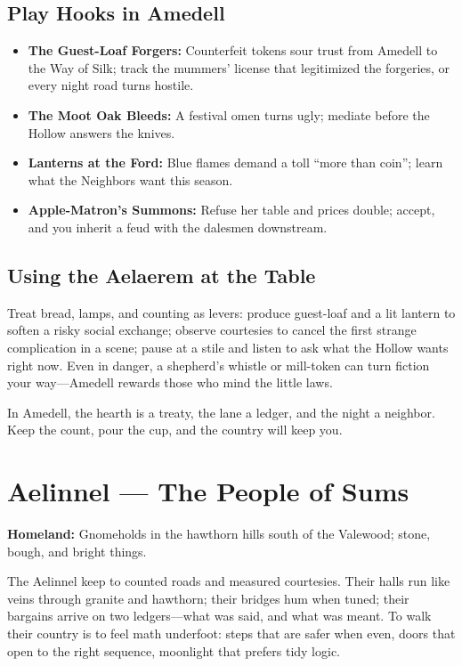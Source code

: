\documentclass[11pt]{book}
\begin{document}
\subsection*{Play Hooks in Amedell}
\begin{itemize}
    \item \textbf{The Guest-Loaf Forgers:} Counterfeit tokens sour trust from Amedell to the Way of Silk; track the mummers' license that legitimized the forgeries, or every night road turns hostile.
    \item \textbf{The Moot Oak Bleeds:} A festival omen turns ugly; mediate before the Hollow answers the knives.
    \item \textbf{Lanterns at the Ford:} Blue flames demand a toll ``more than coin''; learn what the Neighbors want this season.
    \item \textbf{Apple-Matron's Summons:} Refuse her table and prices double; accept, and you inherit a feud with the dalesmen downstream.
\end{itemize}

\subsection*{Using the Aelaerem at the Table}
Treat bread, lamps, and counting as levers: produce guest-loaf and a lit lantern to soften a risky social exchange; observe courtesies to cancel the first strange complication in a scene; pause at a stile and listen to ask what the Hollow wants right now. Even in danger, a shepherd's whistle or mill-token can turn fiction your way---Amedell rewards those who mind the little laws.

In Amedell, the hearth is a treaty, the lane a ledger, and the night a neighbor. Keep the count, pour the cup, and the country will keep you.

\section{Aelinnel --- The People of Sums}
\textbf{Homeland:} Gnomeholds in the hawthorn hills south of the Valewood; stone, bough, and bright things.

The Aelinnel keep to counted roads and measured courtesies. Their halls run like veins through granite and hawthorn; their bridges hum when tuned; their bargains arrive on two ledgers---what was said, and what was meant. To walk their country is to feel math underfoot: steps that are safer when even, doors that open to the right sequence, moonlight that prefers tidy logic.
\end{document}
